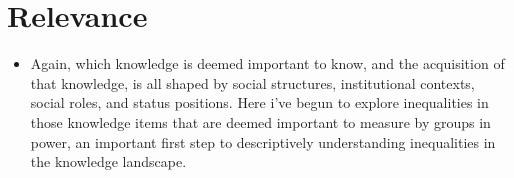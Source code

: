 \documentclass[]{article}
\begin{document}
%

\section{Relevance}
\begin{itemize}
  \item{Again, which knowledge is deemed important to know, and the acquisition of that knowledge, is all shaped by social structures, institutional contexts, social roles, and status positions. Here i've begun to explore inequalities in those knowledge items that are deemed important to measure by groups in power, an important first step to descriptively understanding inequalities in the knowledge landscape.}
\end{itemize}
\end{document}
